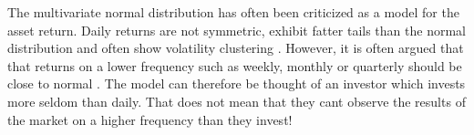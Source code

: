 \documentclass[]{book}\usepackage{knitr}
\begin{document}
The multivariate normal distribution has often been criticized as a model for the asset return. 
Daily returns are not symmetric, exhibit fatter tails than the normal distribution and often show volatility clustering \cite{cont2001empirical}.  
However, it is often argued that that returns on a lower frequency such as weekly, monthly or quarterly should be close to normal \cite{REF}.
The model can therefore be thought of an investor which invests more seldom than daily.
That does not mean that they cant observe the results of the market on a higher frequency than they invest!
\end{document}
